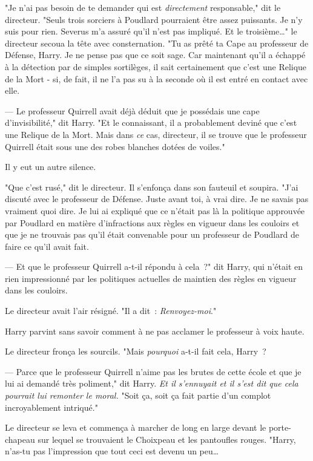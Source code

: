 "Je n'ai pas besoin de te demander qui est \emph{directement} responsable," dit le directeur. "Seuls trois sorciers à Poudlard pourraient être assez puissants. Je n'y suis pour rien. Severus m'a assuré qu'il n'est pas impliqué. Et le troisième…" le directeur secoua la tête avec consternation. "Tu as prêté ta Cape au professeur de Défense, Harry. Je ne pense pas que ce soit sage. Car maintenant qu'il a échappé à la détection par de simples sortilèges, il sait certainement que c'est une Relique de la Mort - si, de fait, il ne l'a pas su à la seconde où il est entré en contact avec elle.

--- Le professeur Quirrell avait déjà déduit que je possédais une cape d'invisibilité," dit Harry. "Et le connaissant, il a probablement deviné que c'est une Relique de la Mort. Mais dans \emph{ce} cas, directeur, il se trouve que le professeur Quirrell était sous une des robes blanches dotées de voiles."

Il y eut un autre silence.

"Que c'est rusé," dit le directeur. Il s'enfonça dans son fauteuil et soupira. "J'ai discuté avec le professeur de Défense. Juste avant toi, à vrai dire. Je ne savais pas vraiment quoi dire. Je lui ai expliqué que ce n'était pas là la politique approuvée par Poudlard en matière d'infractions aux règles en vigueur dans les couloirs et que je ne trouvais pas qu'il était convenable pour un professeur de Poudlard de faire ce qu'il avait fait.

--- Et que le professeur Quirrell a-t-il répondu à cela~?" dit Harry, qui n'était en rien impressionné par les politiques actuelles de maintien des règles en vigueur dans les couloirs.

Le directeur avait l'air résigné. "Il a dit~: \emph{Renvoyez-moi}."

Harry parvint sans savoir comment à ne pas acclamer le professeur à voix haute.

Le directeur fronça les sourcils. "Mais \emph{pourquoi} a-t-il fait cela, Harry~?

--- Parce que le professeur Quirrell n'aime pas les brutes de cette école et que je lui ai demandé très poliment," dit Harry. \emph{Et il s'ennuyait et il s'est dit que cela pourrait lui remonter le moral.} "Soit ça, soit ça fait partie d'un complot incroyablement intriqué."

Le directeur se leva et commença à marcher de long en large devant le porte-chapeau sur lequel se trouvaient le Choixpeau et les pantoufles rouges. "Harry, n'as-tu pas l'impression que tout ceci est devenu un peu…

